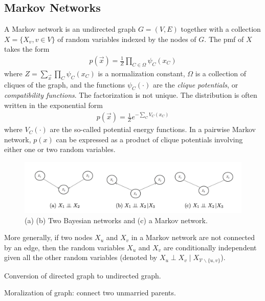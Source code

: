 \documentclass[11pt,a4paper]{article}
\begin{document}
\subsection{Markov Networks}
A Markov network is an undirected graph $G = (V,E)$ together with a collection $X = \{X_v, v \in V\}$ of random variables indexed by the nodes of $G$. The pmf of $X$ takes the form
\begin{equation}
    \begin{aligned}
        p(\vec{x})=\frac{1}{Z}\prod_{C\in \Omega}\psi_C(x_C)
    \end{aligned}
    \nonumber
\end{equation}
where $Z=\sum_{\vec{x}}\prod_{C}\psi_C(x_C)$ is a normalization constant, $\Omega$ is a collection of cliques of the graph, and the functions $\psi_C(\cdot)$ are the \textit{clique potentials}, or \textit{compatibility functions}. The factorization is not unique. The distribution is often written in the exponential form
\begin{equation}
    \begin{aligned}
        p(\vec{x})=\frac{1}{Z}e^{-\sum_CV_C(x_C)}
    \end{aligned}
    \nonumber
\end{equation}
where $V_C(\cdot)$ are the so-called potential energy functions. In a pairwise Markov network, $p(x)$ can be expressed as a product of clique potentials involving either one or two random variables.

\begin{center}\begin{figure}[htbp]
    \centering
    \includegraphics[scale=0.2]{BM.png}
    \caption{(a) (b) Two Bayesian networks and (c) a Markov network.}
    \label{}
\end{figure}\end{center}
More generally, if two nodes $X_u$ and $X_v$ in a Markov network are not connected by an edge, then the random variables $X_u$ and $X_v$ are conditionally independent given all the other random variables (denoted by $X_u \perp X_v \mid X_{\mathcal{V} \backslash\{u, v\}}$).


Conversion of directed graph to undirected graph.

Moralization of graph: connect two unmarried parents.
\end{document}
